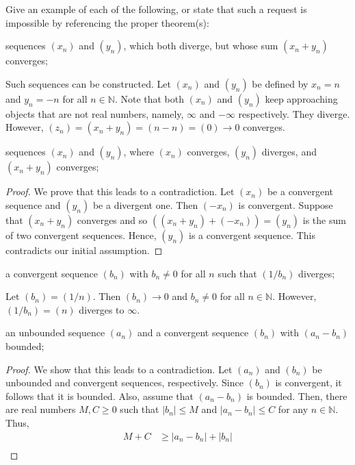 \documentclass[12pt]{article}
\newcommand{\N}{\mathbb{N}}
\newenvironment{problem}[2][Problem]{\begin{trivlist} \item[\hskip \labelsep {\bfseries #1}\hskip \labelsep {\bfseries #2.}]}{\end{trivlist}}
\newenvironment{solution}[1][Solution]{\begin{trivlist} \item[\hskip \labelsep {\bfseries #1}]}{\end{trivlist}}
\begin{document}
    \begin{problem}{2.3.7}
      Give an example of each of the following, or state that such a request is impossible by referencing the proper theorem(s):
    \begin{enumerate}
      \item sequences $(x_{n})$ and $(y_{n})$, which both diverge, but whose sum $(x_{n} + y_{n})$ converges;
    \begin{solution}
      Such sequences can be constructed. Let $(x_{n})$ and $(y_{n})$ be defined by $x_{n} = n$ and $y_{n} = -n$ for all $n\in \N$. Note that both $(x_{n})$ and $(y_{n})$ keep approaching objects that are not real numbers, namely, $\infty$ and $-\infty$ respectively. They diverge. However, $(z_{n}) = (x_{n}+y_{n}) = (n-n) = (0)\to 0$ converges.
    \end{solution}
      \item sequences $(x_{n})$ and $(y_{n})$, where $(x_{n})$ converges, $(y_{n})$ diverges, and $(x_{n} + y_{n})$ converges;
    \begin{proof}
      We prove that this leads to a contradiction. Let $(x_{n})$ be a convergent sequence and $(y_{n})$ be a divergent one. Then $(-x_{n})$ is convergent. Suppose that $(x_{n} + y_{n})$ converges and so $((x_{n}+y_{n})+(-x_{n}))=(y_{n})$ is the sum of two convergent sequences. Hence, $(y_{n})$ is a convergent sequence. This contradicts our initial assumption. 
    \end{proof}
      \item a convergent sequence $(b_{n})$ with $b_{n} \neq 0$ for all $n$ such that $(1/b_{n})$ diverges;
    \begin{solution}
      Let $(b_{n}) = (1/n)$. Then $(b_{n})\to 0$ and $b_{n} \neq 0$ for all $n\in \N$. However, $(1/b_{n}) = (n)$ diverges to $\infty$.
    \end{solution}
      \item an unbounded sequence $(a_{n})$ and a convergent sequence $(b_{n})$ with $(a_{n}-b_{n})$ bounded;
    \begin{proof}
      We show that this leads to a contradiction. Let $(a_{n})$ and $(b_{n})$ be unbounded and convergent sequences, respectively. Since $(b_{n})$ is convergent, it follows that it is bounded. Also, assume that $(a_{n}-b_{n})$ is bounded. Then, there are real numbers $M,C\geq 0$ such that $|b_{n}|\leq M$ and $|a_{n}-b_{n}|\leq C$ for any $n\in \N$. Thus,
    \begin{align*}
      M+C &\geq |a_{n}-b_{n}| + |b_{n}| \\

\end{align*}
\end{proof}
\end{enumerate}
\end{problem}
\end{document}
